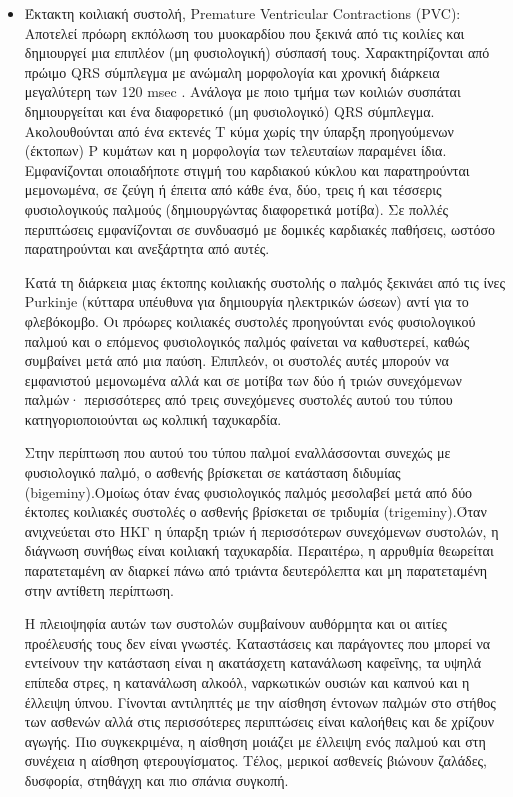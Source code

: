\begin{itemize}
	\item  Έκτακτη κοιλιακή συστολή, \en Premature Ventricular Contractions (PVC)\gr : Αποτελεί πρόωρη εκπόλωση του μυοκαρδίου που ξεκινά από τις κοιλίες και δημιουργεί μια επιπλέον (μη φυσιολογική) σύσπασή τους. Χαρακτηρίζονται από πρώιμο \en QRS \gr σύμπλεγμα με ανώμαλη μορφολογία και χρονική διάρκεια μεγαλύτερη των 120 \en msec \gr . Ανάλογα με ποιο τμήμα των κοιλιών συσπάται δημιουργείται και ένα διαφορετικό (μη φυσιολογικό) \en QRS \gr σύμπλεγμα. Ακολουθούνται από ένα εκτενές Τ κύμα χωρίς την ύπαρξη προηγούμενων (έκτοπων) Ρ κυμάτων και η μορφολογία των τελευταίων παραμένει ίδια. Εμφανίζονται οποιαδήποτε στιγμή του καρδιακού κύκλου και παρατηρούνται μεμονωμένα, σε ζεύγη ή έπειτα από κάθε ένα, δύο, τρεις ή και τέσσερις φυσιολογικούς παλμούς (δημιουργώντας διαφορετικά μοτίβα). Σε πολλές περιπτώσεις εμφανίζονται σε συνδυασμό με δομικές καρδιακές παθήσεις, ωστόσο παρατηρούνται και ανεξάρτητα από αυτές. 
	\par
	Κατά τη διάρκεια μιας έκτοπης κοιλιακής συστολής ο παλμός ξεκινάει από τις ίνες \en Purkinje \gr (κύτταρα υπέυθυνα για δημιουργία ηλεκτρικών ώσεων) αντί για το φλεβόκομβο. Οι πρόωρες κοιλιακές συστολές προηγούνται ενός φυσιολογικού παλμού και ο επόμενος φυσιολογικός παλμός φαίνεται να καθυστερεί, καθώς συμβαίνει μετά από μια παύση. Επιπλεόν, οι συστολές αυτές μπορούν να εμφανιστού μεμονωμένα αλλά και σε μοτίβα των δύο ή τριών συνεχόμενων παλμών· περισσότερες από τρεις συνεχόμενες συστολές αυτού του τύπου κατηγοριοποιούνται ως κολπική ταχυκαρδία.
	\par
	Στην περίπτωση που αυτού του τύπου παλμοί εναλλάσσονται συνεχώς με φυσιολογικό παλμό, ο ασθενής βρίσκεται σε κατάσταση διδυμίας \en (bigeminy).\gr Ομοίως όταν ένας φυσιολογικός παλμός μεσολαβεί μετά από δύο έκτοπες κοιλιακές συστολές ο ασθενής βρίσκεται σε τριδυμία \en (trigeminy).\gr  Όταν ανιχνεύεται στο ΗΚΓ η ύπαρξη τριών ή περισσότερων συνεχόμενων συστολών, η διάγνωση συνήθως είναι κοιλιακή ταχυκαρδία. Περαιτέρω, η αρρυθμία θεωρείται παρατεταμένη αν διαρκεί πάνω από τριάντα δευτερόλεπτα και μη παρατεταμένη στην αντίθετη περίπτωση.
	\par 
	Η πλειοψηφία αυτών των συστολών συμβαίνουν αυθόρμητα και οι αιτίες προέλευσής τους δεν είναι γνωστές. Καταστάσεις και παράγοντες που μπορεί να εντείνουν την κατάσταση είναι η ακατάσχετη κατανάλωση καφεΐνης, τα υψηλά επίπεδα στρες, η κατανάλωση αλκοόλ, ναρκωτικών ουσιών και καπνού και η έλλειψη ύπνου. Γίνονται αντιληπτές με την αίσθηση έντονων παλμών στο στήθος των ασθενών αλλά στις περισσότερες περιπτώσεις είναι καλοήθεις και δε χρίζουν αγωγής. Πιο συγκεκριμένα, η αίσθηση μοιάζει με έλλειψη ενός παλμού και στη συνέχεια η αίσθηση φτερουγίσματος. Τέλος, μερικοί ασθενείς βιώνουν ζαλάδες, δυσφορία, στηθάγχη και πιο σπάνια συγκοπή. 

\end{itemize}
